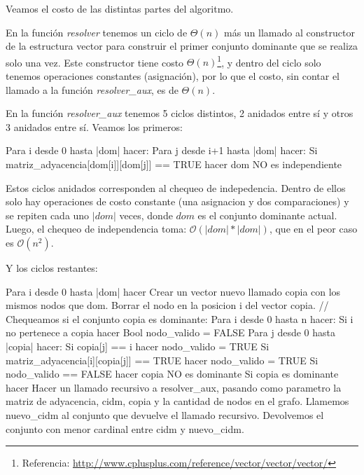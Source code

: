 Veamos el costo de las distintas partes del algoritmo.

En la función \textit{resolver} tenemos un ciclo de $\Theta(n)$ más un llamado al constructor de la estructura vector para construir el primer conjunto dominante que se realiza solo una vez. Este constructor tiene costo $\Theta(n)$\footnote{Referencia: \url{http://www.cplusplus.com/reference/vector/vector/vector/}}, y dentro del ciclo solo tenemos operaciones constantes (asignación), por lo que el costo, sin contar el llamado a la función \textit{resolver_aux}, es de $\Theta(n)$.

En la función \textit{resolver_aux} tenemos 5 ciclos distintos, 2 anidados entre sí y otros 3 anidados entre sí. Veamos los primeros:

\begin{codesnippet}
Para i desde 0 hasta |dom| hacer:
    Para j desde i+1 hasta |dom| hacer:
        Si matriz_adyacencia[dom[i]][dom[j]] == TRUE hacer
            dom NO es independiente
\end{codesnippet}

Estos ciclos anidados corresponden al chequeo de indepedencia. Dentro de ellos solo hay operaciones de costo constante (una asignacion y dos comparaciones) y se repiten cada uno $|dom|$ veces, donde $dom$ es el conjunto dominante actual. Luego, el chequeo de independencia toma: $\mathcal{O}(|dom|*|dom|)$, que en el peor caso es $\mathcal{O}(n^2)$.

Y los ciclos restantes:

\begin{codesnippet}
Para i desde 0 hasta |dom| hacer
    Crear un vector nuevo llamado copia con los mismos nodos que dom.
    Borrar el nodo en la posicion i del vector copia.
    // Chequeamos si el conjunto copia es dominante:
    Para i desde 0 hasta n hacer:
        Si i no pertenece a copia hacer
            Bool nodo_valido = FALSE
            Para j desde 0 hasta |copia| hacer:
                Si copia[j] == i hacer
                    nodo_valido = TRUE
                Si matriz_adyacencia[i][copia[j]] == TRUE hacer
                    nodo_valido = TRUE
            Si nodo_valido == FALSE hacer
                copia NO es dominante
    Si copia es dominante hacer
        Hacer un llamado recursivo a resolver_aux, pasando como parametro la matriz
            de adyacencia, cidm, copia y la cantidad de nodos en el grafo.
        Llamemos nuevo_cidm al conjunto que devuelve el llamado recursivo.
        Devolvemos el conjunto con menor cardinal entre cidm y nuevo_cidm.
\end{codesnippet}

